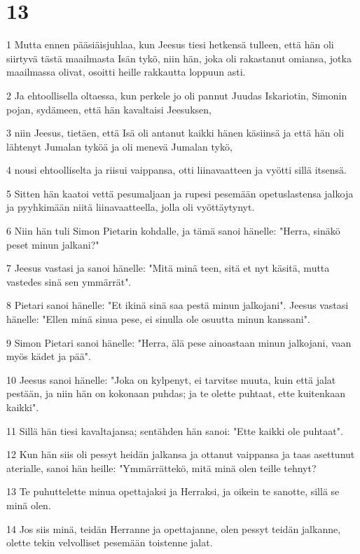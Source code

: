 \chapter{13}

\par 1 Mutta ennen pääsiäisjuhlaa, kun Jeesus tiesi hetkensä tulleen, että hän oli siirtyvä tästä maailmasta Isän tykö, niin hän, joka oli rakastanut omiansa, jotka maailmassa olivat, osoitti heille rakkautta loppuun asti.
\par 2 Ja ehtoollisella oltaessa, kun perkele jo oli pannut Juudas Iskariotin, Simonin pojan, sydämeen, että hän kavaltaisi Jeesuksen,
\par 3 niin Jeesus, tietäen, että Isä oli antanut kaikki hänen käsiinsä ja että hän oli lähtenyt Jumalan tyköä ja oli menevä Jumalan tykö,
\par 4 nousi ehtoolliselta ja riisui vaippansa, otti liinavaatteen ja vyötti sillä itsensä.
\par 5 Sitten hän kaatoi vettä pesumaljaan ja rupesi pesemään opetuslastensa jalkoja ja pyyhkimään niitä liinavaatteella, jolla oli vyöttäytynyt.
\par 6 Niin hän tuli Simon Pietarin kohdalle, ja tämä sanoi hänelle: "Herra, sinäkö peset minun jalkani?"
\par 7 Jeesus vastasi ja sanoi hänelle: "Mitä minä teen, sitä et nyt käsitä, mutta vastedes sinä sen ymmärrät".
\par 8 Pietari sanoi hänelle: "Et ikinä sinä saa pestä minun jalkojani". Jeesus vastasi hänelle: "Ellen minä sinua pese, ei sinulla ole osuutta minun kanssani".
\par 9 Simon Pietari sanoi hänelle: "Herra, älä pese ainoastaan minun jalkojani, vaan myös kädet ja pää".
\par 10 Jeesus sanoi hänelle: "Joka on kylpenyt, ei tarvitse muuta, kuin että jalat pestään, ja niin hän on kokonaan puhdas; ja te olette puhtaat, ette kuitenkaan kaikki".
\par 11 Sillä hän tiesi kavaltajansa; sentähden hän sanoi: "Ette kaikki ole puhtaat".
\par 12 Kun hän siis oli pessyt heidän jalkansa ja ottanut vaippansa ja taas asettunut aterialle, sanoi hän heille: "Ymmärrättekö, mitä minä olen teille tehnyt?
\par 13 Te puhuttelette minua opettajaksi ja Herraksi, ja oikein te sanotte, sillä se minä olen.
\par 14 Jos siis minä, teidän Herranne ja opettajanne, olen pessyt teidän jalkanne, olette tekin velvolliset pesemään toistenne jalat.
